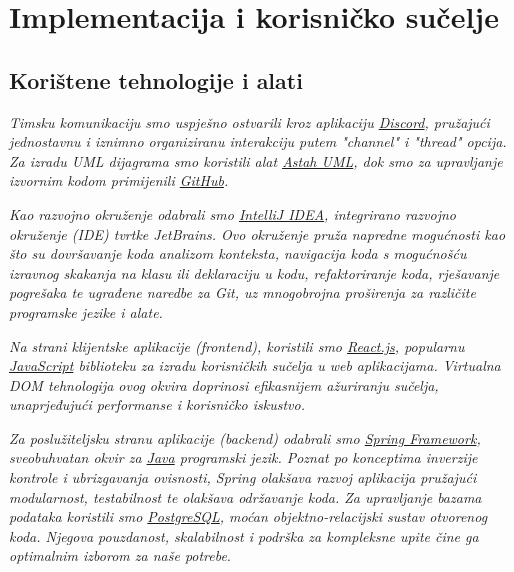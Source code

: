 
\chapter{Implementacija i korisničko sučelje}

		\usepackage{hyperref}
		\usepackage{graphicx}
		
		\section{Korištene tehnologije i alati}

        \textit{ Timsku komunikaciju smo uspješno ostvarili kroz aplikaciju \href{https://discord.com/}{Discord}, pružajući jednostavnu i iznimno organiziranu interakciju putem "channel" i "thread" opcija. Za izradu UML dijagrama smo koristili alat \href{https://astah.net/products/astah-uml/}{Astah UML}, dok smo za upravljanje izvornim kodom primijenili \href{https://github.com/}{GitHub}.}

        \textit{Kao razvojno okruženje odabrali smo \href{https://www.jetbrains.com/idea/}{IntelliJ IDEA}, integrirano razvojno okruženje (IDE) tvrtke JetBrains. Ovo okruženje pruža napredne mogućnosti kao što su dovršavanje koda analizom konteksta, navigacija koda s mogućnošću izravnog skakanja na klasu ili deklaraciju u kodu, refaktoriranje koda, rješavanje pogrešaka te ugrađene naredbe za Git, uz mnogobrojna proširenja za različite programske jezike i alate.}

        \textit{Na strani klijentske aplikacije (frontend), koristili smo \href{https://reactjs.org/}{React.js}, popularnu \href{https://www.javascript.com/}{JavaScript} biblioteku za izradu korisničkih sučelja u web aplikacijama. Virtualna DOM tehnologija ovog okvira doprinosi efikasnijem ažuriranju sučelja, unaprjeđujući performanse i korisničko iskustvo.}

        \textit{Za poslužiteljsku stranu aplikacije (backend) odabrali smo \href{https://spring.io/}{Spring Framework}, sveobuhvatan okvir za \href{https://www.java.com/en/}{Java} programski jezik. Poznat po konceptima inverzije kontrole i ubrizgavanja ovisnosti, Spring olakšava razvoj aplikacija pružajući modularnost, testabilnost te olakšava održavanje koda. Za upravljanje bazama podataka koristili smo \href{https://www.postgresql.org/}{PostgreSQL}, moćan objektno-relacijski sustav otvorenog koda. Njegova pouzdanost, skalabilnost i podrška za kompleksne upite čine ga optimalnim izborom za naše potrebe}.
			
			\eject
		
